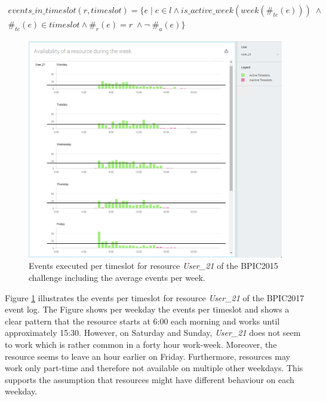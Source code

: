 \begin{equation}\label{def:events_per_timeslot}
  \begin{split}
    events\_in\_timeslot(r, timeslot) = \{ e \; | \; e \in l \wedge is\_active\_week(week(\#_{te}(e))) \; \wedge & \\
    \#_{te}(e) \in timeslot \wedge \#_{r}(e) = r \; \wedge \neg \; \#_{a}(e)\} & 
    \end{split}
\end{equation}


\begin{figure}[h]
	\centering
    \includegraphics[width=\textwidth]{figures/available_timeslots}
    \caption{Events executed per timeslot for resource \textit{User\_21} of the BPIC2015 challenge including the average events per week.}
    \label{fig:available_timeslots}
\end{figure}

Figure \ref{fig:available_timeslots} illustrates the events per timeslot for resource \textit{User\_21} of the BPIC2017 event log. The Figure shows per weekday the events per timeslot and shows a clear pattern that the resource starts at 6:00 each morning and works until approximately 15:30. However, on Saturday and Sunday, \textit{User\_21} does not seem to work which is rather common in a forty hour work-week. Moreover, the resource seems to leave an hour earlier on Friday. Furthermore, resources may work only part-time and therefore not available on multiple other weekdays. This supports the assumption that resources might have different behaviour on each weekday. 

